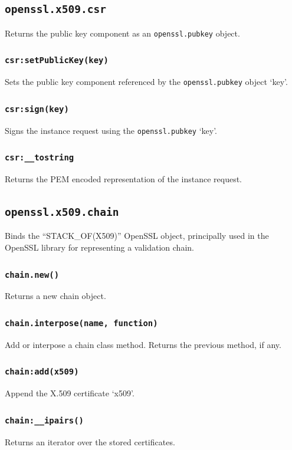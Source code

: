 \documentclass[11pt, oneside]{memoir}
\newcommand*{\fn}[1]{\texttt{#1}\xspace}
\newcommand*{\module}[1]{\texttt{#1}\xspace}
\newcounter{toccols}
\newenvironment{Module}[1]{
	\subsection{\texttt{#1}}
	\addtocontents{toc}{
		\protect\begin{multicols}{\value{toccols}}
	}
}{
	\addtocontents{toc}{\protect\end{multicols}}
}
\begin{document}
\begin{Module}{openssl.x509.csr}
Returns the public key component as an \module{openssl.pubkey} object.

\subsubsection[\fn{csr:setPublicKey}]{\fn{csr:setPublicKey(key)}}

Sets the public key component referenced by the \module{openssl.pubkey} object `key'.

\subsubsection[\fn{car:sign}]{\fn{csr:sign(key)}}

Signs the instance request using the \module{openssl.pubkey} `key'.

\subsubsection[\fn{csr:\_\_tostring}]{\fn{csr:\_\_tostring}}

Returns the PEM encoded representation of the instance request.

\end{Module}


\begin{Module}{openssl.x509.chain}

Binds the ``STACK\_OF(X509)'' OpenSSL object, principally used in the OpenSSL library for representing a validation chain.

\subsubsection[\fn{chain.new}]{\fn{chain.new()}}

Returns a new chain object.

\subsubsection[\fn{chain.interpose}]{\fn{chain.interpose(name, function)}}

Add or interpose a chain class method. Returns the previous method, if any.

\subsubsection[\fn{chain:add}]{\fn{chain:add(x509)}}

Append the X.509 certificate `x509'.

\subsubsection[\fn{chain:\_\_ipairs}]{\fn{chain:\_\_ipairs()}}

Returns an iterator over the stored certificates.

\end{Module}
\end{document}

